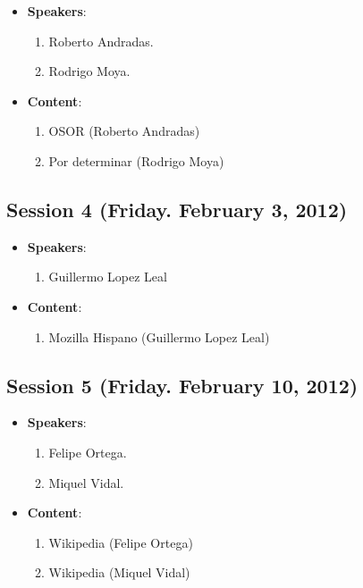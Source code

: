 \documentclass[a4paper]{article}
\begin{document}
\begin{itemize}
 \item \textbf{Speakers}:

  \begin{enumerate}
   \item Roberto Andradas.
    \item Rodrigo Moya.
  \end{enumerate}

 \item \textbf{Content}:

  \begin{enumerate}
   \item OSOR (Roberto Andradas)
    \item Por determinar (Rodrigo Moya)
  \end{enumerate}

\end{itemize}
\subsection{Session 4 (Friday. February 3, 2012)}

\begin{itemize}
 \item \textbf{Speakers}:

  \begin{enumerate}
   \item Guillermo Lopez Leal
  \end{enumerate}

 \item \textbf{Content}:

  \begin{enumerate}
   \item Mozilla Hispano (Guillermo Lopez Leal) 
  \end{enumerate}

\end{itemize}

\subsection{Session 5 (Friday. February 10, 2012)}

\begin{itemize}
 \item \textbf{Speakers}:

  \begin{enumerate}
    \item Felipe Ortega. 
    \item Miquel Vidal. 
  \end{enumerate}

 \item \textbf{Content}:

  \begin{enumerate}
   \item Wikipedia (Felipe Ortega)
   \item Wikipedia (Miquel Vidal)
  \end{enumerate}

\end{itemize}
\end{document}
